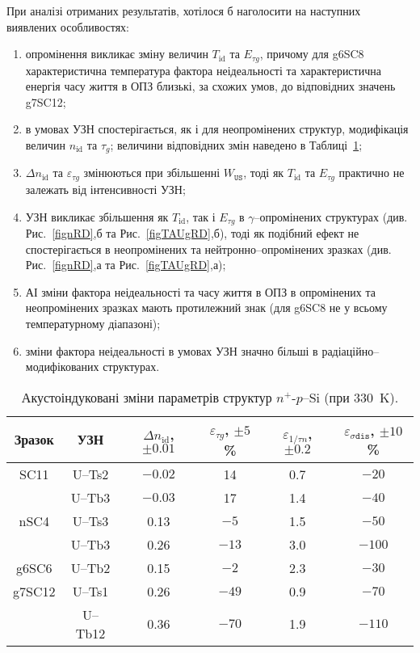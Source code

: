 При аналізі отриманих результатів, хотілося б наголосити на наступних виявлених особливостях:
\begin{enumerate}[label=\asbuk*),leftmargin=0em,itemindent=1.5em]
\item опромінення викликає зміну величин  $T_{\mathrm{id}}$ та $E_{\tau g}$, причому
 для  g6SC8 характеристична температура фактора неідеальності та характеристична енергія часу життя в ОПЗ
 близькі, за схожих умов, до відповідних значень  g7SC12;

\item в умовах УЗН спостерігається, як і для неопромінених структур, модифікація величин $n_{\mathrm{id}}$ та $\tau_g$;
  величини відповідних змін наведено в Таблиці~\ref{tabAIchangeRD};

\item $\Delta n_{\mathrm{id}}$ та $\varepsilon_{\tau g}$ змінюються при збільшенні $W_{\mathtt{US}}$,
 тоді як $T_{\mathrm{id}}$ та $E_{\tau g}$ практично не залежать від інтенсивності УЗН;

\item УЗН викликає збільшення як  $T_{\mathrm{id}}$, так і $E_{\tau g}$ в $\gamma$--опромінених структурах
(див. Рис.~\ref{fignRD},б та Рис.~\ref{figTAUgRD},б),
тоді як подібний ефект не спостерігається в неопромінених та нейтронно--опромінених зразках
(див. Рис.~\ref{fignRD},а та Рис.~\ref{figTAUgRD},а);

\item АІ зміни фактора неідеальності та часу життя в ОПЗ в опромінених та неопромінених зразках мають протилежний знак
 (для g6SC8 не у всьому температурному діапазоні);

\item зміни фактора неідеальності в умовах УЗН значно більші в радіаційно--модифікованих структурах.
\end{enumerate}


\begin{table}
\caption{\label{tabAIchangeRD}Акустоіндуковані зміни параметрів структур $n^+$-$p$--Si (при 330~K).
}
\center
\begin{tabular}{|c|c|c|c|c|c|} \hline
Зразок&УЗН&$\Delta n_{\mathrm{id}}$, $\pm0.01$&$\varepsilon_{\tau g}$, $\pm5$\%&$\varepsilon_{1/\tau n}$, $\pm0.2$&$\varepsilon_{\sigma\mathtt{dis}}$, $\pm10$\%\\
\hline
SC11&U--Ts2&$-0.02$&14&0.7&$-20$\\
&U--Tb3&$-0.03$&17&1.4&$-40$\\ \hline
nSC4&U--Ts3&0.13&$-5$&1.5&$-50$\\
&U--Tb3&0.26&$-13$&3.0&$-100$\\ \hline
g6SC6&U--Tb2&0.15&$-2$&2.3&$-30$\\ \hline
g7SC12&U--Ts1&0.26&$-49$&0.9&$-70$\\
&U--Tb12&0.36&$-70$&1.9&$-110$\\ \hline
\end{tabular}
\end{table}

